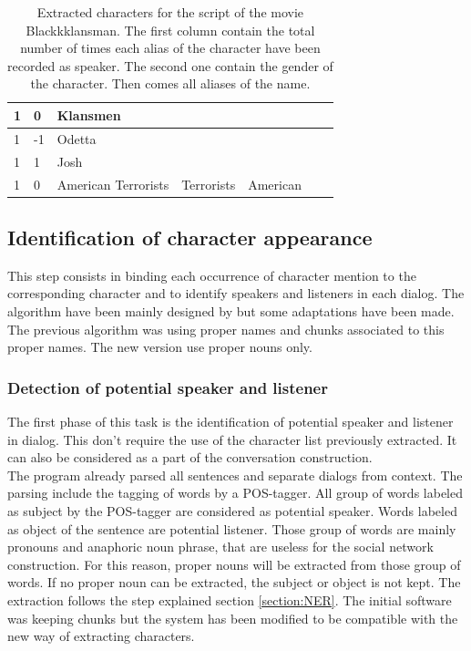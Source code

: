 \documentclass[a4paper, 12pt]{report}
\begin{document}
\begin{table}[]
{\begin{tabular}{|l|l|l|l|l|l|l|}
1                & 0        & Klansmen                   &                  &           &          &            \\ \hline
1                & -1       & Odetta                     &                  &           &          &            \\ \hline
1                & 1        & Josh                       &                  &           &          &            \\ \hline
1                & 0        & American Terrorists        & Terrorists       & American  &          &            \\ \hline
\end{tabular}}
\label{character_bkm}
\caption{Extracted characters for the script of the movie Blackkklansman. The first column contain the total number of times each alias of the character have been recorded as speaker. The second one contain the gender of the character. Then comes all aliases of the name. }
\end{table}

\subsection{Identification of character appearance}
\label{identification}
This step consists in binding each occurrence of character mention to the corresponding character and to identify speakers and listeners in each dialog. The algorithm have been mainly designed by \cite{original_thesis} but some adaptations have been made. The previous algorithm was using proper names and chunks associated to this proper names. The new version use proper nouns only.\\

\subsubsection{Detection of potential speaker and listener}
The first phase of this task is the identification of potential speaker and listener in dialog. This don't require the use of the character list previously extracted. It can also be considered as a part of the conversation construction.\\

The program already parsed all sentences and separate dialogs from context. The parsing include the tagging of words by a POS-tagger. All group of words labeled as subject by the POS-tagger are considered as potential speaker. Words labeled as object of the sentence are potential listener. Those group of words are mainly pronouns and anaphoric noun phrase, that are useless for the social network construction. For this reason, proper nouns will be extracted from those group of words. If no proper noun can be extracted, the subject or object is not kept. The extraction follows the step explained section \ref{section:NER}. The initial software was keeping chunks but the system has been modified to be compatible with the new way of extracting characters.
\end{document}

